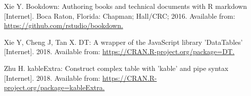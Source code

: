 \documentclass[
  11pt,
  a4paper,
  krantz2]{krantz}
\newlength{\cslhangindent}
\newenvironment{CSLReferences}[2] %
 {\begin{list}{}{%
  \setlength{\itemindent}{0pt}
  \setlength{\leftmargin}{0pt}
  \setlength{\parsep}{0pt}
  \ifodd #1
   \setlength{\leftmargin}{\cslhangindent}
   \setlength{\itemindent}{-1\cslhangindent}
  \fi
  \setlength{\itemsep}{#2\baselineskip}}}
 {\end{list}}
\begin{document}
\begin{footnotesize}
\begin{CSLReferences}{1}{0}
Xie Y. Bookdown: Authoring books and technical documents with {R} markdown {[}Internet{]}. Boca Raton, Florida: Chapman; Hall/CRC; 2016. Available from: \href{https://github.com/rstudio/bookdown}{https://github.com/rstudio/bookdown.}

Xie Y, Cheng J, Tan X. {DT}: A wrapper of the JavaScript library 'DataTables' {[}Internet{]}. 2018. Available from: \href{https://CRAN.R-project.org/package=DT}{https://CRAN.R-project.org/package=DT.}

Zhu H. {kableExtra}: Construct complex table with 'kable' and pipe syntax {[}Internet{]}. 2018. Available from: \href{https://CRAN.R-project.org/package=kableExtra}{https://CRAN.R-project.org/package=kableExtra.}

\end{CSLReferences}

\backmatter
{\small\printindex}


\end{footnotesize} %
\end{document}
